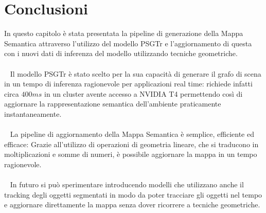 \section{Conclusioni}
In questo capitolo è stata presentata la pipeline di generazione della Mappa Semantica attraverso l'utilizzo del modello PSGTr e l'aggiornamento di questa con i nuovi dati di inferenza del modello utilizzando tecniche geometriche.\\\\
~
Il modello PSGTr è stato scelto per la sua capacità di generare il grafo di scena in un tempo di inferenza ragionevole per applicazioni real time: richiede infatti circa $400ms$ in un cluster avente accesso a NVIDIA T4 permettendo così di aggiornare la rappresentazione semantica dell'ambiente praticamente instantaneamente.\\\\
~
La pipeline di aggiornamento della Mappa Semantica è semplice, efficiente ed efficace: Grazie all'utilizzo di operazioni di geometria lineare, che si traducono in moltiplicazioni e somme di numeri, è possibile aggiornare la mappa in un tempo ragionevole.\\\\
~
In futuro si può sperimentare introducendo modelli \cite{yang2023pvsg} che utilizzano anche il tracking degli oggetti segmentati in modo da poter tracciare gli oggetti nel tempo e aggiornare direttamente la mappa senza dover ricorrere a tecniche geometriche.

